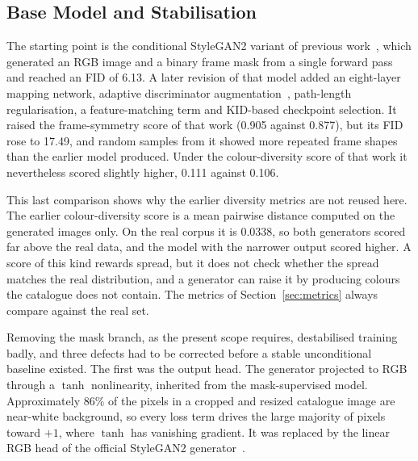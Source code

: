 \documentclass[electronics,article,submit,pdftex,moreauthors]{Definitions/mdpi}
\begin{document}
\subsection{Base Model and Stabilisation}
\label{subsec:base}

The starting point is the conditional StyleGAN2 variant of previous work~\cite{shubitidze2026masks}, which generated an RGB image and a binary
frame mask from a single forward pass and reached an FID of 6.13. A later
revision of that model added an eight-layer mapping network, adaptive
discriminator augmentation~\cite{karras2020ada}, path-length regularisation, a
feature-matching term and KID-based checkpoint selection. It raised the
frame-symmetry score of that work (0.905 against 0.877), but its FID rose
to 17.49, and random samples from it showed more repeated frame shapes than
the earlier model produced. Under the colour-diversity score of that work it
nevertheless scored slightly higher, 0.111 against 0.106.

This last comparison shows why the earlier diversity metrics are not reused here. The earlier colour-diversity score is a mean pairwise distance
computed on the generated images only. On the real corpus it is 0.0338, so
both generators scored far above the real data, and the model with the
narrower output scored higher. A score of this kind rewards spread, but it
does not check whether the spread matches the real distribution, and a
generator can raise it by producing colours the catalogue does not contain.
The metrics of Section~\ref{sec:metrics} always compare against the real
set.

Removing the mask branch, as the present scope requires, destabilised training
badly, and three defects had to be corrected before a stable unconditional
baseline existed. The first was the output head. The generator projected to
RGB through a $\tanh$ nonlinearity, inherited from the mask-supervised model.
Approximately 86\% of the pixels in a cropped and resized catalogue
image are near-white background, so every loss term drives the large majority
of pixels toward $+1$, where $\tanh$ has vanishing gradient. It was replaced by the linear RGB head of the official StyleGAN2
generator~\cite{karras2020stylegan2}.
\end{document}
